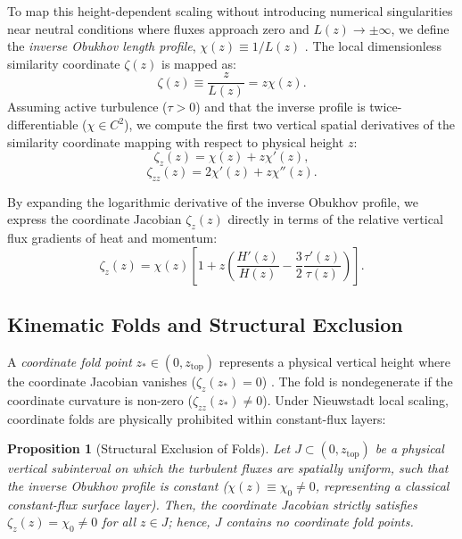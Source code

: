 \documentclass[draft,11pt,twocolumn]{article}
\newtheorem{proposition}{Proposition}
\theoremstyle{definition}
\theoremstyle{remark}
\begin{document}
To map this height-dependent scaling without introducing numerical singularities near neutral conditions where fluxes approach zero and $L(z) \to \pm\infty$, we define the \textit{inverse Obukhov length profile}, $\chi(z) \equiv 1/L(z)$ \cite{STABILITY}. The local dimensionless similarity coordinate $\zeta(z)$ is mapped as:
\begin{equation}
    \zeta(z) \equiv \frac{z}{L(z)} = z \chi(z). \label{eq:inverse_similarity_coord}
\end{equation}
Assuming active turbulence ($\tau > 0$) and that the inverse profile is twice-differentiable ($\chi \in C^2$), we compute the first two vertical spatial derivatives of the similarity coordinate mapping with respect to physical height $z$:
\begin{equation}
    \zeta_z(z) = \chi(z) + z \chi'(z), \label{eq:zeta_z_analytic}
\end{equation}
\begin{equation}
    \zeta_{zz}(z) = 2\chi'(z) + z \chi''(z). \label{eq:zeta_zz_analytic}
\end{equation}

By expanding the logarithmic derivative of the inverse Obukhov profile, we express the coordinate Jacobian $\zeta_z(z)$ directly in terms of the relative vertical flux gradients of heat and momentum:
\begin{equation}
    \zeta_z(z) = \chi(z) \left[ 1 + z \left( \frac{H'(z)}{H(z)} - \frac{3}{2}\frac{\tau'(z)}{\tau(z)} \right) \right]. \label{eq:zeta_z_expanded}
\end{equation}

\subsection{Kinematic Folds and Structural Exclusion}

A \textit{coordinate fold point} $z_* \in (0, z_{\text{top}})$ represents a physical vertical height where the coordinate Jacobian vanishes ($\zeta_z(z_*) = 0$) \cite{CleanRestatement}. The fold is nondegenerate if the coordinate curvature is non-zero ($\zeta_{zz}(z_*) \neq 0$). Under Nieuwstadt local scaling, coordinate folds are physically prohibited within constant-flux layers:

\begin{proposition}[Structural Exclusion of Folds]
Let $J \subset (0, z_{\text{top}})$ be a physical vertical subinterval on which the turbulent fluxes are spatially uniform, such that the inverse Obukhov profile is constant ($\chi(z) \equiv \chi_0 \neq 0$, representing a classical constant-flux surface layer). Then, the coordinate Jacobian strictly satisfies $\zeta_z(z) = \chi_0 \neq 0$ for all $z \in J$; hence, $J$ contains no coordinate fold points.
\end{proposition}
\end{document}
